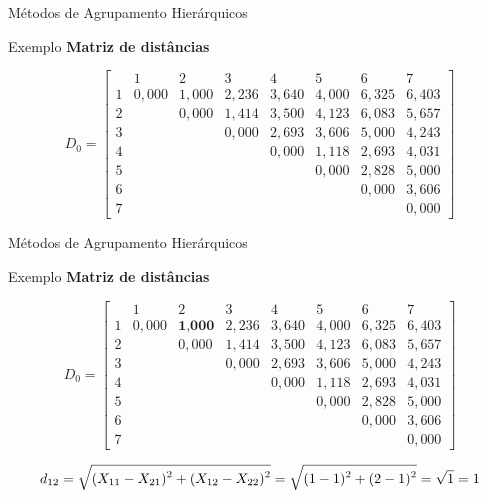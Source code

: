 \documentclass[
  ignorenonframetext,
  aspectratio=169,
]{beamer}
\begin{document}
\begin{frame}{Métodos de Agrupamento Hierárquicos}
\label{muxe9todos-de-agrupamento-hieruxe1rquicos-13}
\begin{block}{Exemplo}
\label{exemplo-2}
\textbf{Matriz de distâncias}

\[D_0 = \left[ \begin{matrix}
&1 & 2&3&4&5&6&7\\ 
1& 0,000 & 1,000 & 2,236 & 3,640 & 4,000 & 6,325 & 6,403 \\
2&  & 0,000 & 1,414 & 3,500 & 4,123 & 6,083 & 5,657 \\
3&  &  & 0,000 & 2,693 & 3,606 & 5,000 & 4,243 \\
4&  &  &  & 0,000 & 1,118 & 2,693 & 4,031 \\
5& &  &  &  & 0,000 & 2,828 & 5,000 \\
6&  &  &  &  &  & 0,000 & 3,606 \\
7&  &  &  &  &  &  & 0,000
                    \end{matrix} \right]\]
\end{block}
\end{frame}

\begin{frame}{Métodos de Agrupamento Hierárquicos}
\label{muxe9todos-de-agrupamento-hieruxe1rquicos-14}
\begin{block}{Exemplo}
\label{exemplo-3}
\textbf{Matriz de distâncias}

\[D_0 = \left[ \begin{matrix}
&1 & 2&3&4&5&6&7\\ 
1& 0,000 & \textbf{1,000} & 2,236 & 3,640 & 4,000 & 6,325 & 6,403 \\
2&  & 0,000 & 1,414 & 3,500 & 4,123 & 6,083 & 5,657 \\
3&  &  & 0,000 & 2,693 & 3,606 & 5,000 & 4,243 \\
4&  &  &  & 0,000 & 1,118 & 2,693 & 4,031 \\
5& &  &  &  & 0,000 & 2,828 & 5,000 \\
6&  &  &  &  &  & 0,000 & 3,606 \\
7&  &  &  &  &  &  & 0,000
                    \end{matrix} \right]\]

\[\scriptsize d_{12} = \sqrt{\displaystyle{(X_{11} - X_{21})^2 + (X_{12} - X_{22})^2}} = 
\sqrt{\displaystyle{(1 - 1)^2 + (2 - 1)^2}} = \sqrt{1} = 1\]
\end{block}
\end{frame}
\end{document}
